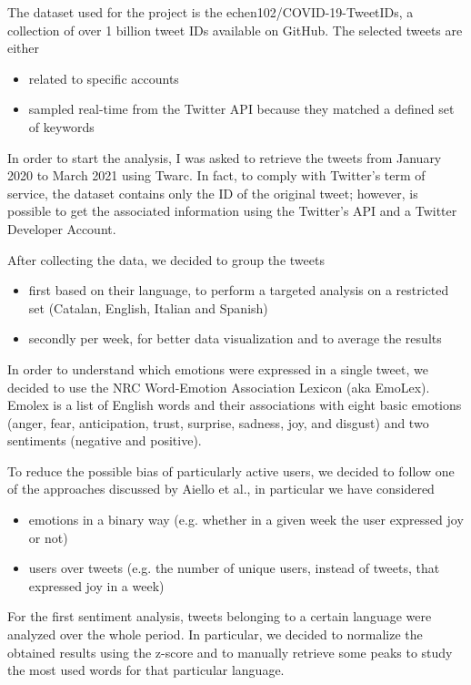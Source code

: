 The dataset used for the project is the echen102/COVID-19-TweetIDs, a collection of over 1 billion tweet IDs available on GitHub. The selected tweets are either

\begin{itemize}
	\item related to specific accounts
	\item sampled real-time from the Twitter API because they matched a defined set of keywords
\end{itemize}

In order to start the analysis, I was asked to retrieve the tweets from January 2020 to March 2021 using Twarc. In fact, to comply with Twitter's term of service, the dataset contains only the ID of the original tweet; however, is possible to get the associated information using the Twitter's API and a Twitter Developer Account.

After collecting the data, we decided to group the tweets 

\begin{itemize}
	\item first based on their language, to perform a targeted analysis on a restricted set (Catalan, English, Italian and Spanish)
	\item secondly per week, for better data visualization and to average the results
\end{itemize}

In order to understand which emotions were expressed in a single tweet, we decided to use the NRC Word-Emotion Association Lexicon (aka EmoLex). Emolex is a list of English words and their associations with eight basic emotions (anger, fear, anticipation, trust, surprise, sadness, joy, and disgust) and two sentiments (negative and positive).

To reduce the possible bias of particularly active users, we decided to follow one of the approaches discussed by Aiello et al., in particular we have considered
	
\begin{itemize}
	\item emotions in a binary way (e.g. whether in a given week the user expressed joy or not)
	\item users over tweets (e.g. the number of unique users, instead of tweets, that expressed joy in a week)
\end{itemize}


For the first sentiment analysis, tweets belonging to a certain language were analyzed over the whole period. In particular, we decided to normalize the obtained results using the z-score and to manually retrieve some peaks to study the most used words for that particular language.

